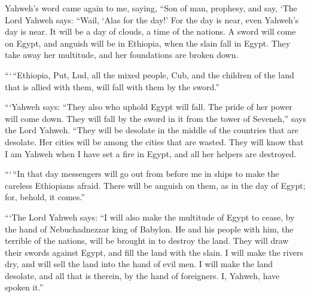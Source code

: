  Yahweh's word came again to me, saying,  ``Son
of man, prophesy, and say, `The Lord Yahweh says: ``Wail, `Alas for the
day!'  For the day is near, even Yahweh's day is near. It
will be a day of clouds, a time of the nations.  A sword
will come on Egypt, and anguish will be in Ethiopia, when the slain fall
in Egypt. They take away her multitude, and her foundations are broken
down.

 ```\,``Ethiopia, Put, Lud, all the mixed people, Cub, and
the children of the land that is allied with them, will fall with them
by the sword.''

 ```Yahweh says: ``They also who uphold Egypt will fall. The
pride of her power will come down. They will fall by the sword in it
from the tower of Seveneh,'' says the Lord Yahweh.  ``They
will be desolate in the middle of the countries that are desolate. Her
cities will be among the cities that are wasted.  They will
know that I am Yahweh when I have set a fire in Egypt, and all her
helpers are destroyed.

 ```\,``In that day messengers will go out from before me in
ships to make the careless Ethiopians afraid. There will be anguish on
them, as in the day of Egypt; for, behold, it comes.''

 ```The Lord Yahweh says: ``I will also make the multitude
of Egypt to cease, by the hand of Nebuchadnezzar king of Babylon.
 He and his people with him, the terrible of the nations,
will be brought in to destroy the land. They will draw their swords
against Egypt, and fill the land with the slain.  I will
make the rivers dry, and will sell the land into the hand of evil men. I
will make the land desolate, and all that is therein, by the hand of
foreigners. I, Yahweh, have spoken it.''

